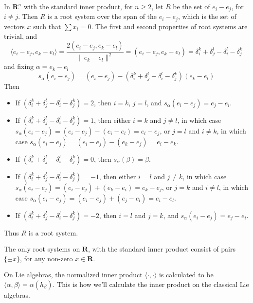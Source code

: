 \begin{example}
    In $\mathbf{R}^n$ with the standard inner product, for $n \geq 2$, let $R$ be the set of $e_i - e_j$, for $i \neq j$. Then $R$ is a root system over the span of the $e_i - e_j$, which is the set of vectors $x$ such that $\sum x_i = 0$. The first and second properties of root systems are trivial, and
    \[ \langle e_i - e_j, e_k - e_l \rangle = \frac{2(e_i - e_j, e_k - e_l)}{\| e_k - e_l \|^2} = (e_i - e_j, e_k - e_l) = \delta_i^k + \delta_j^l - \delta_i^l - \delta_j^k \]
    and fixing $\alpha = e_k - e_l$
    \[ s_\alpha(e_i - e_j) = (e_i - e_j) - (\delta_i^k + \delta_j^l - \delta_i^l - \delta_j^k) (e_k - e_l) \]
    Then
    \begin{itemize}
        \item If $(\delta_i^k + \delta_j^l - \delta_i^l - \delta_j^k) = 2$, then $i = k$, $j = l$, and $s_\alpha(e_i - e_j) = e_j - e_i$.
        \item If $(\delta_i^k + \delta_j^l - \delta_i^l - \delta_j^k) = 1$, then either $i = k$ and $j \neq l$, in which case $s_\alpha(e_i - e_j) = (e_i - e_j) - (e_i - e_l) = e_l - e_j$, or $j = l$ and $i \neq k$, in which case $s_\alpha(e_i - e_j) = (e_i - e_j) - (e_k - e_j) = e_i - e_k$.
        \item If $(\delta_i^k + \delta_j^l - \delta_i^l - \delta_j^k) = 0$, then $s_\alpha(\beta) = \beta$.
        \item If $(\delta_i^k + \delta_j^l - \delta_i^l - \delta_j^k) = -1$, then either $i = l$ and $j \neq k$, in which case $s_\alpha(e_i - e_j) = (e_i - e_j) + (e_k - e_i) = e_k - e_j$, or $j = k$ and $i \neq l$, in which case $s_\alpha(e_i - e_j) = (e_i - e_j) + (e_j - e_l) = e_i - e_l$.
        \item If $(\delta_i^k + \delta_j^l - \delta_i^l - \delta_j^k) = -2$, then $i = l$ and $j = k$, and $s_\alpha(e_i - e_j) = e_j - e_i$.
    \end{itemize}
    Thus $R$ is a root system.
\end{example}

\begin{example}
    The only root systems on $\mathbf{R}$, with the standard inner product consist of pairs $\{ \pm x \}$, for any non-zero $x \in \mathbf{R}$.
\end{example}

On Lie algebras, the normalized inner product $\langle \cdot, \cdot \rangle$ is calculated to be $\langle \alpha, \beta \rangle = \alpha(h_\beta)$. This is how we'll calculate the inner product on the classical Lie algebras.

